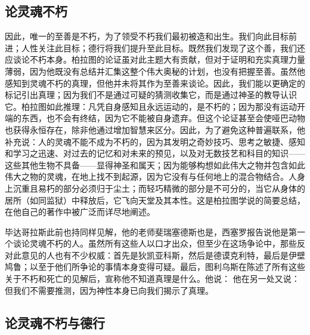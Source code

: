 
\subsection{论灵魂不朽}

因此，唯一的至善是不朽，为了领受不朽我们最初被造和出生。我们向此目标前进；人性关注此目标；德行将我们提升至此目标。既然我们发现了这个善，我们还应谈论不朽本身。柏拉图的论证虽对此主题大有贡献，但对于证明和充实真理力量薄弱，因为他既没有总结并汇集这整个伟大奥秘的计划，也没有把握至善。虽然他感知到灵魂不朽的真理，但他并未将其作为至善来谈论。因此，我们能以更确定的标记引出真理；因为我们不是通过可疑的猜测收集它，而是通过神圣的教导认识它。柏拉图如此推理：凡凭自身感知且永远运动的，是不朽的；因为那没有运动开端的东西，也不会有终结，因为它不能被自身遗弃。但这个论证甚至会使哑巴动物也获得永恒存在，除非他通过增加智慧来区分。因此，为了避免这种普遍联系，他补充说：人的灵魂不能不成为不朽的，因为其发明之奇妙技巧、思考之敏捷、感知和学习之迅速、对过去的记忆和对未来的预见，以及对无数技艺和科目的知识——这些其他生物不具备——显得神圣和属天；因为能够构想如此伟大之物并包含如此伟大之物的灵魂，在地上找不到起源，因为它没有与任何地上的混合物结合。人身上沉重且易朽的部分必须归于尘土；而轻巧精微的部分是不可分的，当它从身体的居所（如同监狱）中释放后，它飞向天堂及其本性。这是柏拉图学说的简要总结，在他自己的著作中被广泛而详尽地阐述。\par

毕达哥拉斯此前也持同样见解，他的老师斐瑞塞德斯也是，西塞罗报告说他是第一个谈论灵魂不朽的人。虽然所有这些人以口才出众，但至少在这场争论中，那些反对此意见的人也有不少权威：首先是狄凯亚科斯，然后是德谟克利特，最后是伊壁鸠鲁；以至于他们所争论的事情本身变得可疑。最后，图利乌斯在陈述了所有这些关于不朽和死亡的见解后，宣称他不知道真理是什么。他说： 他在另一处又说： 但我们不需要推测，因为神性本身已向我们揭示了真理。\par


\subsection{论灵魂不朽与德行}

